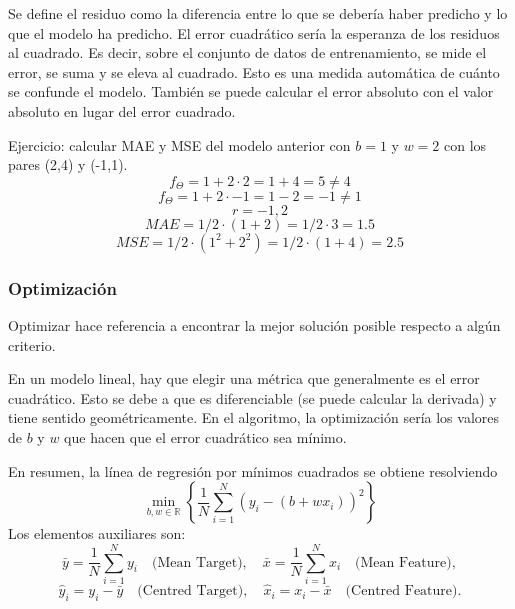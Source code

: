 Se define el residuo como la diferencia entre lo que se debería haber predicho y lo que el modelo ha predicho. El error cuadrático sería la esperanza de los residuos al cuadrado. Es decir, sobre el conjunto de datos de entrenamiento, se mide el error, se suma y se eleva al cuadrado. Esto es una medida automática de cuánto se confunde el modelo. También se puede calcular el error absoluto con el valor absoluto en lugar del error cuadrado. 

Ejercicio: calcular MAE y MSE del modelo anterior con $b=1$ y $w=2$ con los pares (2,4) y (-1,1).
$$f_{\Theta} = 1 + 2 \cdot 2 = 1 + 4 = 5 \neq 4$$
$$f_{\Theta} = 1 + 2 \cdot -1 = 1 - 2 = -1 \neq 1$$
$$r = -1, 2$$
$$MAE = 1/2 \cdot (1 + 2) = 1/2 \cdot 3 = 1.5$$
$$MSE = 1/2 \cdot (1^2 + 2^2) = 1/2 \cdot (1 + 4) = 2.5$$

\subsubsection{Optimización}
Optimizar hace referencia a encontrar la mejor solución posible respecto a algún criterio. 

En un modelo lineal, hay que elegir una métrica que generalmente es el error cuadrático. Esto se debe a que es diferenciable (se puede calcular la derivada) y tiene sentido geométricamente. En el algoritmo, la optimización sería los valores de $b$ y $w$ que hacen que el error cuadrático sea mínimo.

En resumen, la línea de regresión por mínimos cuadrados se obtiene resolviendo
$$\min_{b, w \in \mathbb{R}} \left\{ \frac{1}{N} \sum_{i=1}^{N} \left( y_i - (b + w x_i) \right)^2 \right\}$$
Los elementos auxiliares son:
$$
\bar{y} = \frac{1}{N} \sum_{i=1}^{N} y_i \quad \text{(Mean Target)}, \quad
\bar{x} = \frac{1}{N} \sum_{i=1}^{N} x_i \quad \text{(Mean Feature)},
$$
$$
\hat{y}_i = y_i - \bar{y} \quad \text{(Centred Target)}, \quad
\hat{x}_i = x_i - \bar{x} \quad \text{(Centred Feature)}.
$$

